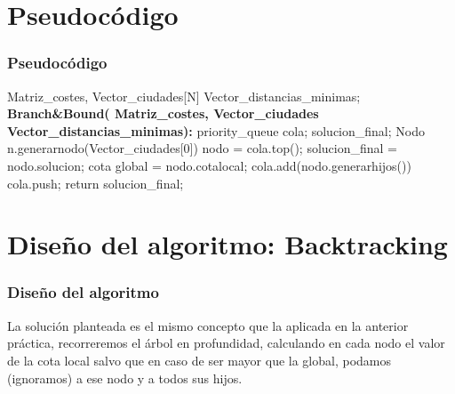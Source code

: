 \documentclass{beamer}
\begin{document}
	\section{Pseudocódigo}
	
	\begin{frame}
		\frametitle{Pseudocódigo}
		\footnotesize{	
			\begin{algorithmic}				
				\Require Matriz\_costes, Vector\_ciudades[N] Vector\_distancias\_minimas; 
				\State \textbf{Branch\&Bound( Matriz\_costes, Vector\_ciudades Vector\_distancias\_minimas):}
				\State priority\_queue cola;
				\State solucion\_final;
				\State	 Nodo n.generarnodo(Vector\_ciudades[0])
							\State nodo = cola.top();
							\State solucion\_final = nodo.solucion;
							\State cota global = nodo.cotalocal;
							\EndIf
							\State cola.add(nodo.generarhijos())
							\State cola.push;
							\Else
							\State return solucion\_final;
							
							\EndIf
							
									\EndWhile
							
				
				
			\end{algorithmic}	
		}
	\end{frame}
	
\section{Diseño del algoritmo: Backtracking} 
\begin{frame}
	\frametitle{Diseño del algoritmo}
	
	La solución planteada es el mismo concepto que la aplicada en la anterior práctica, recorreremos el árbol en profundidad, calculando en cada nodo el valor de la cota local salvo que en caso de ser mayor que la global, podamos (ignoramos) a ese nodo y a todos sus hijos.
	
	
\end{frame}	
\end{document}

